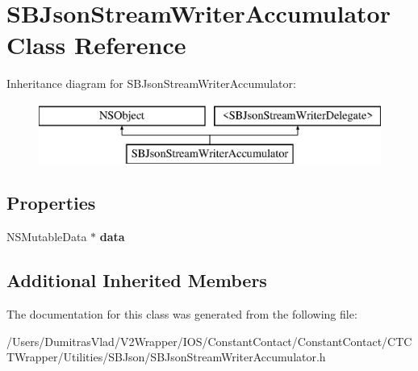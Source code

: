 \hypertarget{interface_s_b_json_stream_writer_accumulator}{\section{S\-B\-Json\-Stream\-Writer\-Accumulator Class Reference}
\label{interface_s_b_json_stream_writer_accumulator}
}
Inheritance diagram for S\-B\-Json\-Stream\-Writer\-Accumulator\-:\begin{figure}[H]
\begin{center}
\leavevmode
\includegraphics[height=2.000000cm]{interface_s_b_json_stream_writer_accumulator}
\end{center}
\end{figure}
\subsection*{Properties}
\begin{DoxyCompactItemize}
\item 
\hypertarget{interface_s_b_json_stream_writer_accumulator_a21f8d0b93b372f25bd79b05558c04b1d}{N\-S\-Mutable\-Data $\ast$ {\bfseries data}}\label{interface_s_b_json_stream_writer_accumulator_a21f8d0b93b372f25bd79b05558c04b1d}

\end{DoxyCompactItemize}
\subsection*{Additional Inherited Members}


The documentation for this class was generated from the following file\-:\begin{DoxyCompactItemize}
\item 
/\-Users/\-Dumitras\-Vlad/\-V2\-Wrapper/\-I\-O\-S/\-Constant\-Contact/\-Constant\-Contact/\-C\-T\-C\-T\-Wrapper/\-Utilities/\-S\-B\-Json/S\-B\-Json\-Stream\-Writer\-Accumulator.\-h\end{DoxyCompactItemize}
